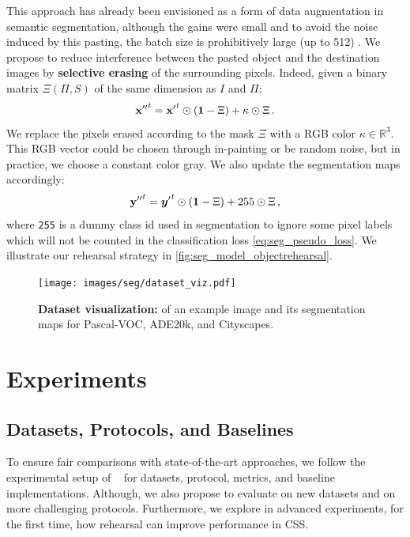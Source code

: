 This approach has already been envisioned as a form of data augmentation in semantic segmentation,
although the gains were small and to avoid the noise induced by this pasting, the batch size is
prohibitively large (up to 512) \citep{ghiasi2020simplecopypaste}. We propose to reduce interference
between the pasted object and the destination images by \textbf{selective erasing} of the
surrounding pixels. Indeed, given a binary matrix $\Xi(\Pi, S)$ of the same dimension as $I$ and
$\Pi$:
%
\begin{equation}
    {\mathbf{x}''}^t = {\mathbf{x}'}^t \odot (\mathbf{1} - \Xi) + \kappa \odot \Xi\,.
    \label{eq:seg_erasing_pixel}
\end{equation}
%
We replace the pixels erased according to the mask $\Xi$ with a RGB color $\kappa \in \mathbb{R}^3$.
This RGB vector could be chosen through in-painting \citep{fang2019instaboost} or be random noise,
but in practice, we choose a constant color gray. We also update the segmentation maps accordingly:
%
\begin{equation}
    {\mathbf{y}''}^t = {{\bm{y}}'}^t \odot (\mathbf{1} - \Xi) + 255 \odot \Xi\,,
    \label{eq:seg_erasing_label}
\end{equation}
%
\noindent where \texttt{255} is a dummy class id used in segmentation to ignore some pixel labels
which will not be counted in the classification loss \autoref{eq:seg_pseudo_loss}. We illustrate our
rehearsal strategy in \autoref{fig:seg_model_objectrehearsal}.



\begin{figure}
    \centering
    \texttt{[image: images/seg/dataset\_viz.pdf]}
    \caption{\textbf{Dataset visualization:} of an example image and its segmentation maps for
        Pascal-VOC, ADE20k, and Cityscapes.}
    \label{fig:seg_dataset_viz}
\end{figure}

\section{Experiments}
\label{sec:seg_exp}

\subsection{Datasets, Protocols, and Baselines}
\label{sec:seg_datasets_protocols}

To ensure fair comparisons with state-of-the-art approaches, we follow the experimental setup of
~\citet{cermelli2020modelingthebackground} for datasets, protocol, metrics, and baseline
implementations. Although, we also propose to evaluate on new datasets and on more challenging
protocols. Furthermore, we explore in advanced experiments, for the first time, how rehearsal can
improve performance in \ac{CSS}.

